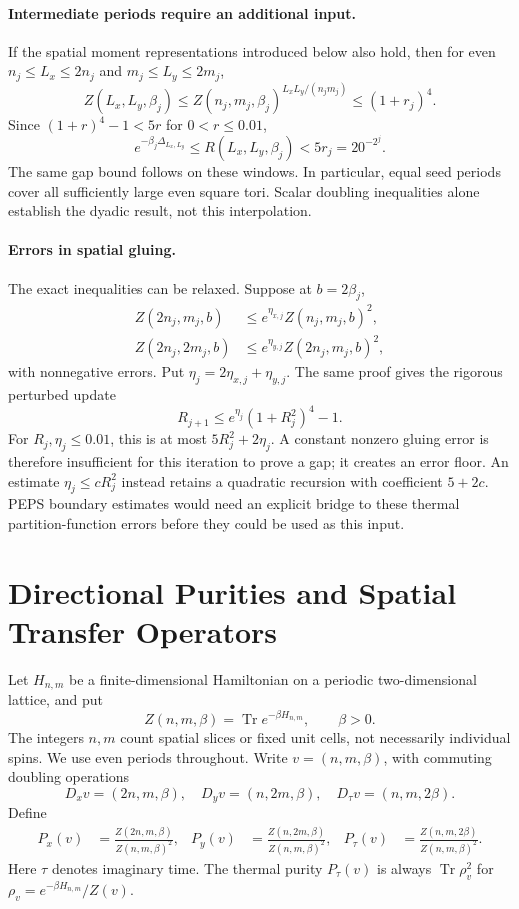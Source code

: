 \documentclass[11pt]{article}
\newcommand{\Tr}{\operatorname{Tr}}
\begin{document}
\paragraph{Intermediate periods require an additional input.}
If the spatial moment representations introduced below also hold,
then for even \(n_j\le L_x\le2n_j\) and \(m_j\le L_y\le2m_j\),
\[
	Z(L_x,L_y,\beta_j)
	\le Z(n_j,m_j,\beta_j)^{L_xL_y/(n_jm_j)}
	\le(1+r_j)^4.
\]
Since \((1+r)^4-1<5r\) for \(0<r\le0.01\),
\[
	e^{-\beta_j\Delta_{L_x,L_y}}
	\le R(L_x,L_y,\beta_j)<5r_j=20^{-2^j}.
\]
The same gap bound follows on these windows. In particular, equal seed
periods cover all sufficiently large even square tori. Scalar doubling
inequalities alone establish the dyadic result, not this interpolation.

\paragraph{Errors in spatial gluing.}
The exact inequalities can be relaxed. Suppose at \(b=2\beta_j\),
\begin{align*}
	Z(2n_j,m_j,b)  & \le e^{\eta_{x,j}}Z(n_j,m_j,b)^2,  \\
	Z(2n_j,2m_j,b) & \le e^{\eta_{y,j}}Z(2n_j,m_j,b)^2,
\end{align*}
with nonnegative errors. Put \(\eta_j=2\eta_{x,j}+\eta_{y,j}\).
The same proof gives the rigorous perturbed update
\begin{equation}
	\boxed{R_{j+1}\le e^{\eta_j}(1+R_j^2)^4-1.}
	\label{eq:ff-perturbed}
\end{equation}
For \(R_j,\eta_j\le0.01\), this is at most
\(5R_j^2+2\eta_j\). A constant nonzero gluing error is therefore
insufficient for this iteration to prove a gap; it creates an error
floor. An estimate \(\eta_j\le cR_j^2\) instead retains a quadratic
recursion with coefficient \(5+2c\). PEPS boundary estimates would
need an explicit bridge to these thermal partition-function errors
before they could be used as this input.

\section{Directional Purities and Spatial Transfer Operators}

Let \(H_{n,m}\) be a finite-dimensional Hamiltonian on a periodic
two-dimensional lattice, and put
\[
	Z(n,m,\beta)=\Tr e^{-\beta H_{n,m}},\qquad \beta>0.
\]
The integers \(n,m\) count spatial slices or fixed unit cells, not
necessarily individual spins. We use even periods throughout.
Write \(v=(n,m,\beta)\), with commuting doubling operations
\[
	D_xv=(2n,m,\beta),\quad D_yv=(n,2m,\beta),\quad
	D_\tau v=(n,m,2\beta).
\]
Define
\begin{align}
	P_x(v) & =\frac{Z(2n,m,\beta)}{Z(n,m,\beta)^2}, &
	P_y(v) & =\frac{Z(n,2m,\beta)}{Z(n,m,\beta)^2}, &
	P_\tau(v) & =\frac{Z(n,m,2\beta)}{Z(n,m,\beta)^2}.
	\label{eq:purities}
\end{align}
Here \(\tau\) denotes imaginary time. The thermal purity \(P_\tau(v)\) is always
\(\Tr\rho_v^2\) for \(\rho_v=e^{-\beta H_{n,m}}/Z(v)\).
\end{document}
